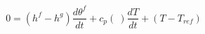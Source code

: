 \begin{equation}
0= (h^f-h^g) \frac{d\theta^f }{dt} + c_p(\ ) \frac{d T}{dt} +  (T- T_{ref}) 
\end{equation}